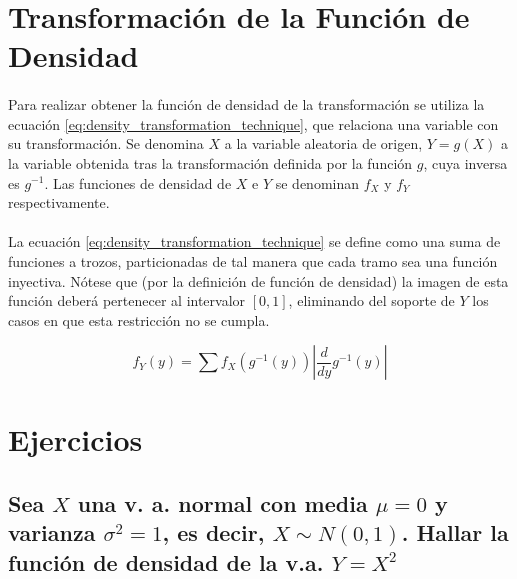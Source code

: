 \documentclass{article}
\begin{document}
	\maketitle
  \thispagestyle{empty}


  \section{Transformación de la Función de Densidad}

    \paragraph{}
    Para realizar obtener la función de densidad de la transformación se utiliza la ecuación \eqref{eq:density_transformation_technique}, que relaciona una variable con su transformación. Se denomina $X$ a la variable aleatoria de origen, $Y = g(X)$ a la variable obtenida tras la transformación definida por la función $g$, cuya inversa es $g^{-1}$. Las funciones de densidad de $X$ e $Y$ se denominan $f_X$ y $f_Y$ respectivamente.

    \paragraph{}
    La ecuación \eqref{eq:density_transformation_technique} se define como una suma de funciones a trozos, particionadas de tal manera que cada tramo sea una función inyectiva. Nótese que (por la definición de función de densidad) la imagen de esta función deberá pertenecer al intervalor $[0,1]$, eliminando del soporte de $Y$ los casos en que esta restricción no se cumpla.

    \begin{equation}
    \label{eq:density_transformation_technique}
      f_Y (y) = \sum f_X \left( g^{-1} (y) \right) \left| \frac{d}{dy} g^{-1} (y) \right|
    \end{equation}

  \section{Ejercicios}

	\subsection{Sea $X$ una v. a. normal con media $\mu = 0$ y varianza $\sigma^2 = 1$, es decir, $ X \sim N(0,1)$. Hallar la función de densidad de la v.a. $Y = X^2$}
\end{document}
